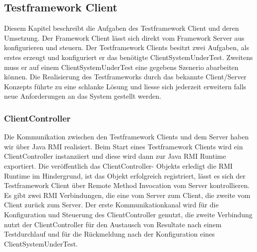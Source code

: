 \subsection{Testframework Client}
\label{sec:test-FW Client}
Diesem Kapitel beschreibt die Aufgaben des Testframework Client und deren Umsetzung. Der Framework Client lässt sich direkt vom Framework Server aus konfigurieren und steuern. Der Testframework Clients besitzt zwei Aufgaben, als erstes erzeugt und konfiguriert er das benötigte ClientSystemUnderTest. Zweitens muss er auf einem ClientSystemUnderTest eine gegebens Szenerio abarbeiten können. Die Realisierung des Testframeworks durch das bekannte Client/Server Konzepts führte zu eine schlanke Lösung und liesse sich jederzeit erweitern falls neue Anforderungen an das System gestellt werden.


\subsubsection{ClientController}
\label{sec:clientController}
Die Kommunikation zwischen den Testframework Clients und dem Server haben wir über Java RMI realisiert. Beim Start eines Testframework Clients wird ein ClientController instanziiert und diese wird dann zur Java RMI Runtime exportiert. Die veröffentlich das ClientController- Objekts erledigt die RMI Runtime im Hindergrund, ist das Objekt erfolgreich registriert, lässt es sich der Testframework Client über Remote Method Invocation vom Server kontrollieren. Es gibt zwei RMI Verbindungen, die eine vom Server zum Client, die zweite vom Client zurück zum Server. Der erste Kommunikationkanal wird für die Konfiguration und Steuerung des ClientController genutzt, die zweite Verbindung nutzt der ClientController für den Austausch von Resultate nach einem Testdurchlauf und für die Rückmeldung nach der Konfiguration eines ClientSystemUnderTest.

